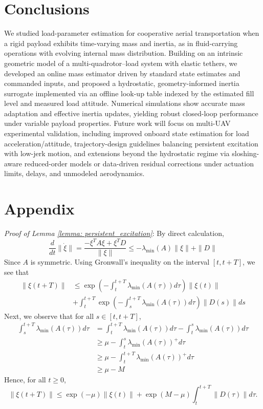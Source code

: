 \documentclass[letterpaper, 10 pt, conference]{ieeeconf}  %
\begin{document}
\section*{Conclusions}
We studied load-parameter estimation for cooperative aerial transportation when a rigid payload exhibits time-varying mass and inertia, as in fluid-carrying operations with evolving internal mass distribution. Building on an intrinsic geometric model of a multi-quadrotor--load system with elastic tethers, we developed an online mass estimator driven by standard state estimates and commanded inputs, and proposed a hydrostatic, geometry-informed inertia surrogate implemented via an offline look-up table indexed by the estimated fill level and measured load attitude. Numerical simulations show accurate mass adaptation and effective inertia updates, yielding robust closed-loop performance under variable payload properties. Future work will focus on multi-UAV experimental validation, including improved onboard state estimation for load acceleration/attitude, trajectory-design guidelines balancing persistent excitation with low-jerk motion, and extensions beyond the hydrostatic regime via sloshing-aware reduced-order models or data-driven residual corrections under actuation limits, delays, and unmodeled aerodynamics.



\section{Appendix}
\textit{Proof of Lemma \ref{lemma: persistent_excitation}}: By direct calculation,
    $$\frac{d}{dt} \|\dot{\xi}\| = \frac{-\xi^T A \xi + \xi^T D}{\|\xi\|} \le -\lambda_{\min}(A)\|\xi\| + \|D\|$$
    Since $A$ is symmetric. Using Gronwall's inequality on the interval $[t, t+T]$, we see that
    \begin{align*}
        \|\xi(t+T)\| &\le \exp\left(-\int_t^{t+T} \lambda_{\min}(A(\tau))d\tau \right)\|\xi(t)\| \\
        &+ \int_t^{t+T} \exp\left( -\int_s^{t+T}\lambda_{\min}(A(\tau))d\tau\right)\|D(s)\|ds
    \end{align*}
    Next, we observe that for all $s \in [t, t+T]$,
    \begin{align*}
        \int_s^{t+T} \lambda_{\min}(A(\tau))d\tau &= \int_t^{t+T} \lambda_{\min}(A(\tau))d\tau - \int_t^s \lambda_{\min}(A(\tau))d\tau \\
        &\ge \mu - \int_t^s \lambda_{\min}(A(\tau))^+d\tau \\
        &\ge \mu - \int_t^{t+T} \lambda_{\min}(A(\tau))^+ d\tau \\
        &\ge \mu - M
    \end{align*}
    Hence, for all $t \ge 0$,
    $$\|\xi(t+T)\| \le \exp(-\mu)\|\xi(t)\| + \exp(M-\mu)\int_t^{t+T} \|D(\tau)\|d\tau.$$
\end{document}
